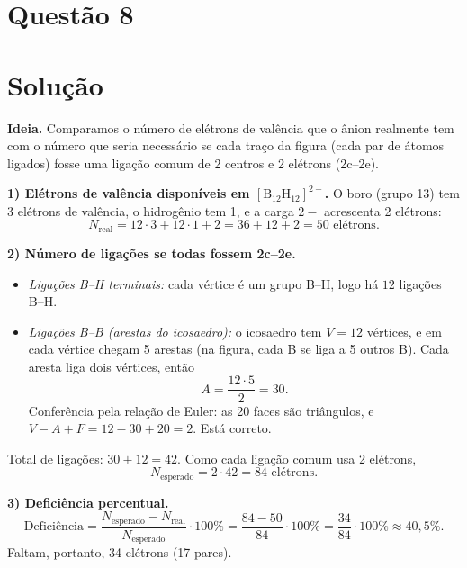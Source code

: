 \documentclass{article}%
\begin{document}
\section*{Questão 8}

\section*{Solução}

\textbf{Ideia.} Comparamos o número de elétrons de valência que o ânion realmente tem com o número que seria necessário se cada traço da figura (cada par de átomos ligados) fosse uma ligação comum de 2 centros e 2 elétrons (2c--2e).

\medskip
\textbf{1) Elétrons de valência disponíveis em $[\mathrm{B_{12}H_{12}}]^{2-}$.}
O boro (grupo 13) tem 3 elétrons de valência, o hidrogênio tem 1, e a carga $2-$ acrescenta 2 elétrons:
\[
N_{\text{real}} = 12\cdot 3 + 12\cdot 1 + 2 = 36 + 12 + 2 = 50 \text{ elétrons}.
\]

\medskip
\textbf{2) Número de ligações se todas fossem 2c--2e.}
\begin{itemize}
\item \emph{Ligações B--H terminais:} cada vértice é um grupo B--H, logo há $12$ ligações B--H.
\item \emph{Ligações B--B (arestas do icosaedro):} o icosaedro tem $V = 12$ vértices, e em cada vértice chegam 5 arestas (na figura, cada B se liga a 5 outros B). Cada aresta liga dois vértices, então
\[
A = \frac{12\cdot 5}{2} = 30 .
\]
Conferência pela relação de Euler: as 20 faces são triângulos, e $V - A + F = 12 - 30 + 20 = 2$. Está correto.
\end{itemize}
Total de ligações: $30 + 12 = 42$. Como cada ligação comum usa 2 elétrons,
\[
N_{\text{esperado}} = 2\cdot 42 = 84 \text{ elétrons}.
\]

\medskip
\textbf{3) Deficiência percentual.}
\[
\text{Deficiência} = \frac{N_{\text{esperado}} - N_{\text{real}}}{N_{\text{esperado}}}\cdot 100\%
= \frac{84 - 50}{84}\cdot 100\% = \frac{34}{84}\cdot 100\% \approx 40{,}5\% .
\]
Faltam, portanto, 34 elétrons (17 pares).
\end{document}
